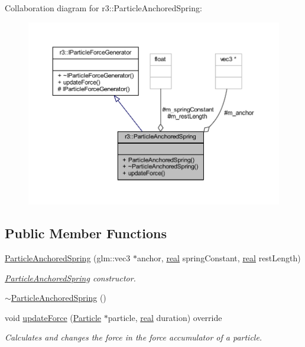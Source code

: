 Collaboration diagram for r3\+:\+:Particle\+Anchored\+Spring\+:\nopagebreak
\begin{figure}[H]
\begin{center}
\leavevmode
\includegraphics[width=350pt]{classr3_1_1_particle_anchored_spring__coll__graph}
\end{center}
\end{figure}
\subsection*{Public Member Functions}
\begin{DoxyCompactItemize}
\item 
\mbox{\hyperlink{classr3_1_1_particle_anchored_spring_adc141455ffbe50ec1595679cc3fe9753}{Particle\+Anchored\+Spring}} (glm\+::vec3 $\ast$anchor, \mbox{\hyperlink{namespacer3_ab2016b3e3f743fb735afce242f0dc1eb}{real}} spring\+Constant, \mbox{\hyperlink{namespacer3_ab2016b3e3f743fb735afce242f0dc1eb}{real}} rest\+Length)
\begin{DoxyCompactList}\small\item\em \mbox{\hyperlink{classr3_1_1_particle_anchored_spring}{Particle\+Anchored\+Spring}} constructor. \end{DoxyCompactList}\item 
\mbox{\hyperlink{classr3_1_1_particle_anchored_spring_ab82659ed05c6dc0e3a60a68fa50d3f3e}{$\sim$\+Particle\+Anchored\+Spring}} ()
\item 
void \mbox{\hyperlink{classr3_1_1_particle_anchored_spring_aa445db9e0efcc25a422348f4e580ed7f}{update\+Force}} (\mbox{\hyperlink{classr3_1_1_particle}{Particle}} $\ast$particle, \mbox{\hyperlink{namespacer3_ab2016b3e3f743fb735afce242f0dc1eb}{real}} duration) override
\begin{DoxyCompactList}\small\item\em Calculates and changes the force in the force accumulator of a particle. \end{DoxyCompactList}\end{DoxyCompactItemize}
